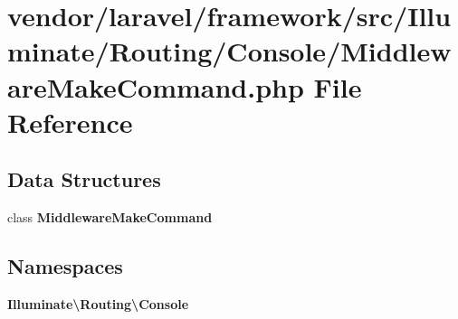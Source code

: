 \section{vendor/laravel/framework/src/\+Illuminate/\+Routing/\+Console/\+Middleware\+Make\+Command.php File Reference}
\label{_middleware_make_command_8php}
\subsection*{Data Structures}
\begin{DoxyCompactItemize}
\item 
class {\bf Middleware\+Make\+Command}
\end{DoxyCompactItemize}
\subsection*{Namespaces}
\begin{DoxyCompactItemize}
\item 
 {\bf Illuminate\textbackslash{}\+Routing\textbackslash{}\+Console}
\end{DoxyCompactItemize}
